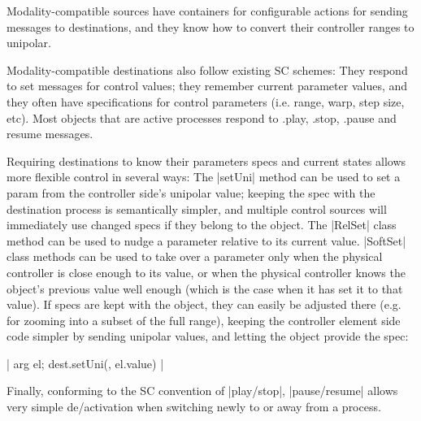 \documentclass{article}
\newcommand{\todo}[1] {\emph{\textbf{TODO:} #1}}
\begin{document}
% 

Modality-compatible sources have containers for configurable actions for sending messages to destinations, and they know how to convert their controller ranges to unipolar.

Modality-compatible destinations also follow existing SC schemes: They respond to set messages for control values; they remember current parameter values, and they often have specifications for control parameters (i.e. range, warp, step size, etc). Most objects that are active processes respond to .play, .stop, .pause and resume messages. 

Requiring destinations to know their parameters specs and current states allows more flexible control in several ways: 
The |setUni| method can be used to set a param from the controller side's unipolar value; keeping the spec with the destination process is semantically simpler, and multiple control sources will immediately use changed specs if they belong to the object. 
The |RelSet| class method can be used to nudge a parameter relative to its current value. 
|SoftSet| class methods can be used to take over a parameter only when the physical controller is close enough to its value, or when the physical controller knows the object's previous value well enough (which is the case when it has set it to that value). 
If specs are kept with the object, they can easily be adjusted there (e.g. for zooming into a subset of the full range), keeping the controller element side code simpler by sending unipolar values, and letting the object provide the spec:

|{ arg el; dest.setUni(\amp, el.value) }|

Finally, conforming to the SC convention of |play/stop|, |pause/resume| allows very simple de/activation when switching newly to or away from a process. 
\end{document}
